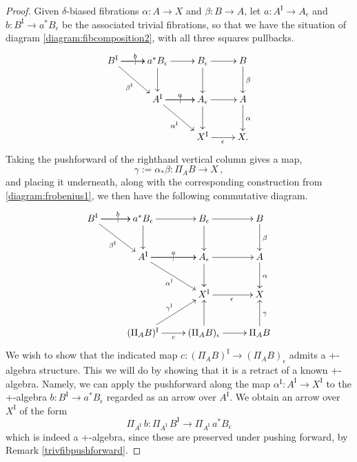\documentclass[11pt,reqno]{amsart}
\newcommand{\ra}{\ensuremath{\rightarrow}}
\renewcommand{\to}{\ensuremath{\rightarrow}}
\newcommand{\too}{\ensuremath{\longrightarrow}}
\newcommand{\I}{\ensuremath{\mathrm{I}}}
\theoremstyle{remark}
\theoremstyle{definition}
\begin{document}
\begin{proof}
Given $\delta$-biased fibrations $\alpha : A \ra X$ and $\beta: B\ra A$, let $a : A^\I \ra A_\epsilon$ and $b : B^\I \ra a^*B_\epsilon$ be the associated trivial fibrations, so that we have the situation of diagram \eqref{diagram:fibcomposition2}, with all three squares pullbacks.
\begin{equation}\label{diagram:frobenius1.5}
\xymatrix{
B^\I \ar[r]|| \ar[r]^{b} \ar[rd]_{\beta^\I}  & a^*B_\epsilon \ar[r]  \ar[d]  & B_{\epsilon}  \ar[d]   \ar[r] & B \ar[d]^\beta \\
&A^\I \ar[r]|| \ar[r]^{a} \ar[rd]_{\alpha^\I}  & A_{\epsilon} \ar[d]   \ar[r] & A \ar[d]^\alpha \\
&& X^\I \ar[r]_{\epsilon} &  X.
}
\end{equation}
Taking the pushforward of the righthand vertical column gives a map, 
\[
\gamma:= \alpha_*\beta : \Pi_A{B} \to X\,,
\]
and placing it underneath, along with the corresponding construction from \eqref{diagram:frobenius1}, we then have the following commutative diagram.
 \begin{equation}\label{diagram:frobenius2.5}
\xymatrix{
B^\I \ar[r]|| \ar[r]^{b} \ar[rd]_{\beta^\I}  & a^*B_\epsilon \ar[r]  \ar[d]  & B_{\epsilon}  \ar[d]   \ar[r] & B \ar[d]^\beta \\
& A^\I \ar[r]|| \ar[r]^{a} \ar[rd]_{\alpha^\I}  & A_{\epsilon} \ar[d]   \ar[r] & A \ar[d]^\alpha \\
&& X^\I \ar[r]_{\epsilon} &  X \\
& (\Pi_AB)^\I  \ar[r]_c  \ar[ru]^{\gamma^\I} & (\Pi_AB)_\epsilon  \ar[u] \ar[r] & \Pi_AB \ar[u]_\gamma 
}
\end{equation}
We wish to show that the indicated  map $c : (\Pi_AB)^\I \ra (\Pi_AB)_\epsilon$
admits a +-algebra structure. This we will do by showing that it is a retract of a known +-algebra.
Namely, we can apply the pushforward along the map $\alpha^\I:A^\I \ra X^\I$ to the +-algebra $b : B^\I \ra a^*B_\epsilon$ regarded as an arrow over $A^\I$.  We obtain an arrow over $X^\I$ of the form
\begin{equation}\label{plusalgretract}
\Pi_{A^\I}\,b :  \Pi_{A^\I}\,B^\I \too \Pi_{A^\I}\,a^*B_\epsilon 
\end{equation}
which is indeed a +-algebra, since these are preserved under pushing forward, by Remark \ref{trivfibpushforward}.


\end{proof}
\end{document}
